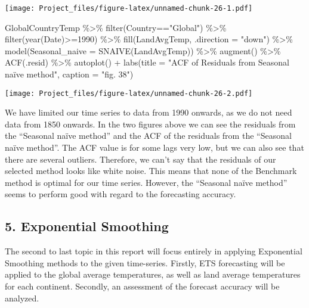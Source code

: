\documentclass[
]{article}
\newenvironment{Shaded}{\begin{snugshade}}{\end{snugshade}}
\newcommand{\AttributeTok}[1]{\textcolor[rgb]{0.77,0.63,0.00}{#1}}
\newcommand{\DecValTok}[1]{\textcolor[rgb]{0.00,0.00,0.81}{#1}}
\newcommand{\FunctionTok}[1]{\textcolor[rgb]{0.00,0.00,0.00}{#1}}
\newcommand{\NormalTok}[1]{#1}
\newcommand{\SpecialCharTok}[1]{\textcolor[rgb]{0.00,0.00,0.00}{#1}}
\newcommand{\StringTok}[1]{\textcolor[rgb]{0.31,0.60,0.02}{#1}}
\begin{document}
\texttt{[image: Project\_files/figure-latex/unnamed-chunk-26-1.pdf]}

\begin{Shaded}
\begin{Highlighting}[]
\NormalTok{GlobalCountryTemp }\SpecialCharTok{\%\textgreater{}\%} 
  \FunctionTok{filter}\NormalTok{(Country}\SpecialCharTok{==}\StringTok{"Global"}\NormalTok{) }\SpecialCharTok{\%\textgreater{}\%}
  \FunctionTok{filter}\NormalTok{(}\FunctionTok{year}\NormalTok{(Date)}\SpecialCharTok{\textgreater{}=}\DecValTok{1990}\NormalTok{) }\SpecialCharTok{\%\textgreater{}\%}
  \FunctionTok{fill}\NormalTok{(LandAvgTemp, }\AttributeTok{.direction =} \StringTok{"down"}\NormalTok{) }\SpecialCharTok{\%\textgreater{}\%} 
  \FunctionTok{model}\NormalTok{(}\AttributeTok{Seasonal\_naive =} \FunctionTok{SNAIVE}\NormalTok{(LandAvgTemp)) }\SpecialCharTok{\%\textgreater{}\%} 
  \FunctionTok{augment}\NormalTok{() }\SpecialCharTok{\%\textgreater{}\%} 
  \FunctionTok{ACF}\NormalTok{(.resid) }\SpecialCharTok{\%\textgreater{}\%} 
  \FunctionTok{autoplot}\NormalTok{() }\SpecialCharTok{+} \FunctionTok{labs}\NormalTok{(}\AttributeTok{title =} \StringTok{"ACF of Residuals from Seasonal naïve method"}\NormalTok{, }\AttributeTok{caption =} \StringTok{"fig. 38"}\NormalTok{)}
\end{Highlighting}
\end{Shaded}

\texttt{[image: Project\_files/figure-latex/unnamed-chunk-26-2.pdf]}

We have limited our time series to data from 1990 onwards, as we do not
need data from 1850 onwards. In the two figures above we can see the
residuals from the ``Seasonal naïve method'' and the ACF of the
residuals from the ``Seasonal naïve method''. The ACF value is for some
lags very low, but we can also see that there are several outliers.
Therefore, we can't say that the residuals of our selected method looks
like white noise. This means that none of the Benchmark method is
optimal for our time series. However, the ``Seasonal naïve method''
seems to perform good with regard to the forecasting accuracy.

\hypertarget{exponential-smoothing}{%
\subsection{5. Exponential Smoothing}\label{exponential-smoothing}}

The second to last topic in this report will focus entirely in applying
Exponential Smoothing methods to the given time-series. Firstly, ETS
forecasting will be applied to the global average temperatures, as well
as land average temperatures for each continent. Secondly, an assessment
of the forecast accuracy will be analyzed.
\end{document}
